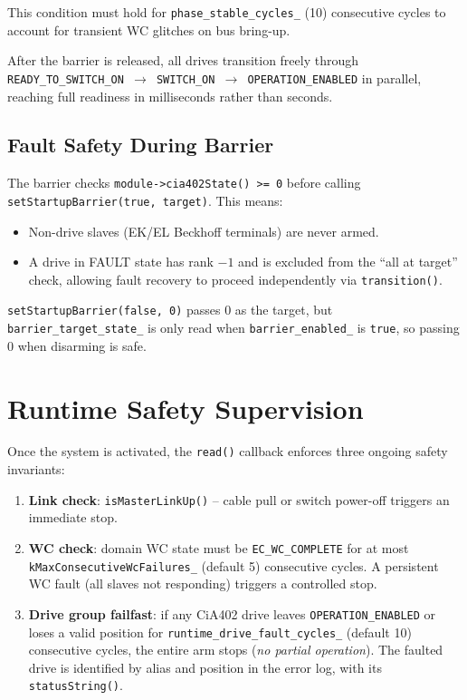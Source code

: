 \documentclass[11pt,a4paper]{article}
\begin{document}
This condition must hold for \texttt{phase\_stable\_cycles\_} (10) consecutive
cycles to account for transient WC glitches on bus bring-up.

After the barrier is released, all drives transition freely through
\texttt{READY\_TO\_SWITCH\_ON $\to$ SWITCH\_ON $\to$ OPERATION\_ENABLED}
in parallel, reaching full readiness in milliseconds rather than seconds.

\subsection{Fault Safety During Barrier}

The barrier checks \texttt{module->cia402State() >= 0} before calling
\texttt{setStartupBarrier(true, target)}.  This means:
\begin{itemize}[nosep]
  \item Non-drive slaves (EK/EL Beckhoff terminals) are never armed.
  \item A drive in FAULT state has rank $-1$ and is excluded from the
        ``all at target'' check, allowing fault recovery to proceed
        independently via \texttt{transition()}.
\end{itemize}

\texttt{setStartupBarrier(false, 0)} passes 0 as the target, but
\texttt{barrier\_target\_state\_} is only read when
\texttt{barrier\_enabled\_} is \texttt{true}, so passing 0 when disarming
is safe.

\section{Runtime Safety Supervision}
\label{sec:runtime-safety}

Once the system is activated, the \texttt{read()} callback enforces three
ongoing safety invariants:

\begin{enumerate}
  \item \textbf{Link check}: \texttt{isMasterLinkUp()} -- cable pull or
        switch power-off triggers an immediate stop.
  \item \textbf{WC check}: domain WC state must be
        \texttt{EC\_WC\_COMPLETE} for at most \texttt{kMaxConsecutiveWcFailures\_}
        (default 5) consecutive cycles.  A persistent WC fault (all slaves
        not responding) triggers a controlled stop.
  \item \textbf{Drive group failfast}: if any CiA402 drive leaves
        \texttt{OPERATION\_ENABLED} or loses a valid position for
        \texttt{runtime\_drive\_fault\_cycles\_} (default 10) consecutive
        cycles, the entire arm stops (\emph{no partial operation}).
        The faulted drive is identified by alias and position in the error
        log, with its \texttt{statusString()}.
\end{enumerate}
\end{document}
